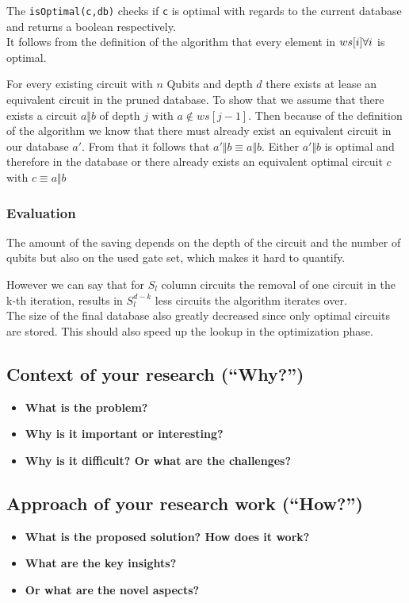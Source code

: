 The \texttt{isOptimal(c,db)} checks if \texttt{c} is optimal with regards to the current database  and returns a boolean respectively.\\

It follows from the definition of the algorithm that every element in $ws[i]\space\forall i$ is optimal. 

For every existing circuit with $n$ Qubits and depth $d$ there exists at lease an equivalent circuit in the pruned database. To show that we assume that there exists a circuit $a\Vert b$ of depth $j$ with $a\not\in ws[j-1]$. Then because of the definition of the algorithm we know that there must already exist an equivalent circuit in our database $a'$. From that it follows that $a'\Vert b\equiv a\Vert b$. Either $a'\Vert b$ is optimal and therefore in the database or there already exists an equivalent optimal circuit $c$ with $c\equiv a\Vert b$

\subsubsection{Evaluation}
The amount of the saving depends on the depth of the circuit and the number of qubits but also on the used gate set, which makes it hard to quantify. 

However we can say that for $S_l$ column circuits the removal of one circuit in the k-th iteration, results in $S_l^{d-k}$ less circuits the algorithm iterates over.\\

The size of the final database also greatly decreased since only optimal circuits are stored. This should also speed up the lookup in the optimization phase.
\subsection{Context of your research (``Why?'')}
\begin{itemize}
  \item \textbf{What is the problem?}
  \item \textbf{Why is it important or interesting?}
  \item \textbf{Why is it difficult? Or what are the challenges?}
\end{itemize}

\subsection{Approach of your research work (``How?'')}
\begin{itemize}
  \item \textbf{What is the proposed solution? How does it work?}
  \item \textbf{What are the key insights?}
  \item \textbf{Or what are the novel aspects?}
\end{itemize}

